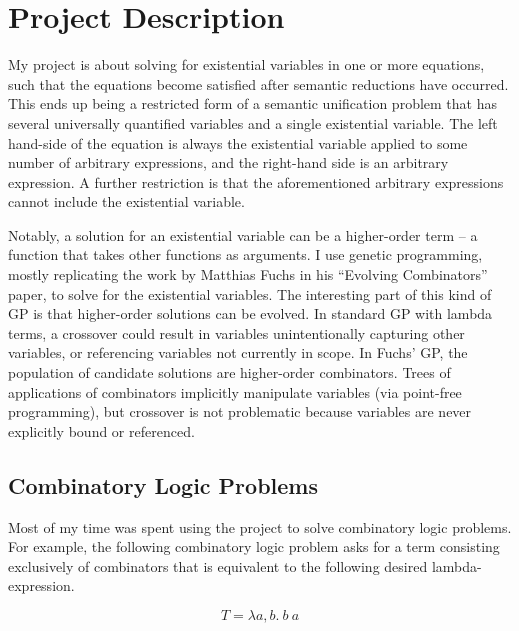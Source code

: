 \documentclass{article}
\begin{document}
\lstset{language=Haskell}

\maketitle

\section{Project Description}

My project is about solving for existential variables in one or more
equations, such that the equations become satisfied after semantic
reductions have occurred. This ends up being a restricted form of a
semantic unification problem that has several universally quantified
variables and a single existential variable. The left hand-side of the
equation is always the existential variable applied to some number of
arbitrary expressions, and the right-hand side is an arbitrary
expression. A further restriction is that the aforementioned arbitrary
expressions cannot include the existential variable.

Notably, a solution for an existential variable can be a
higher-order term -- a function that takes other functions as
arguments. I use genetic programming, mostly replicating the work by
Matthias Fuchs in his ``Evolving Combinators'' paper, to solve for the
existential variables. The interesting part of this kind of GP is that
higher-order solutions can be evolved. In standard GP with lambda
terms, a crossover could result in variables unintentionally capturing
other variables, or referencing variables not currently in scope. In
Fuchs' GP, the population of candidate solutions are higher-order
combinators. Trees of applications of combinators implicitly
manipulate variables (via point-free programming), but crossover is
not problematic because variables are never explicitly bound or
referenced.

\subsection{Combinatory Logic Problems}

Most of my time was spent using the project to solve combinatory logic
problems. For example, the following combinatory logic problem asks for a term
consisting exclusively of combinators that is equivalent to the following
desired lambda-expression.

$$
T = \lambda a,b . ~ b ~ a
$$
\end{document}
